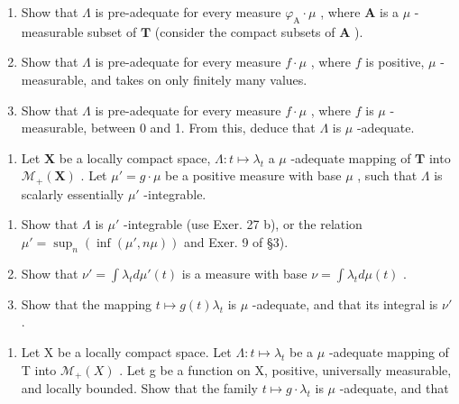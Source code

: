 \begin{enumerate}
\def\labelenumi{\alph{enumi})}
\item
  Show that \(\Lambda\) is pre-adequate for every measure \(\varphi_{\mathrm{A}}\cdot \mu\) , where \(\mathbf{A}\) is a \(\mu\) -measurable subset of \(\mathbf{T}\) (consider the compact subsets of \(\mathbf{A}\) ).
\item
  Show that \(\Lambda\) is pre-adequate for every measure \(f \cdot \mu\) , where \(f\) is positive, \(\mu\) -measurable, and takes on only finitely many values.
\item
  Show that \(\Lambda\) is pre-adequate for every measure \(f \cdot \mu\) , where \(f\) is \(\mu\) -measurable, between 0 and 1. From this, deduce that \(\Lambda\) is \(\mu\) -adequate.
\end{enumerate}

\begin{enumerate}
\def\labelenumi{\arabic{enumi})}
\setcounter{enumi}{27}
\tightlist
\item
  Let \(\mathbf{X}\) be a locally compact space, \(\Lambda : t \mapsto \lambda_t\) a \(\mu\) -adequate mapping of \(\mathbf{T}\) into \(\mathcal{M}_+(\mathbf{X})\) . Let \(\mu' = g \cdot \mu\) be a positive measure with base \(\mu\) , such that \(\Lambda\) is scalarly essentially \(\mu'\) -integrable.
\end{enumerate}

\begin{enumerate}
\def\labelenumi{\alph{enumi})}
\item
  Show that \(\Lambda\) is \(\mu'\) -integrable (use Exer. 27 b), or the relation \(\mu' = \sup_n \left( \inf(\mu', n\mu) \right)\) and Exer. 9 of §3).
\item
  Show that \(\nu' = \int \lambda_t d\mu'(t)\) is a measure with base \(\nu = \int \lambda_t d\mu(t)\) .
\item
  Show that the mapping \(t \mapsto g(t)\lambda_t\) is \(\mu\) -adequate, and that its integral is \(\nu'\) .
\end{enumerate}

\begin{enumerate}
\def\labelenumi{\arabic{enumi})}
\setcounter{enumi}{28}
\tightlist
\item
  Let X be a locally compact space. Let \(\Lambda: t \mapsto \lambda_{t}\) be a \(\mu\) -adequate mapping of T into \(\mathcal{M}_{+}(X)\) . Let g be a function on X, positive, universally measurable, and locally bounded. Show that the family \(t \mapsto g \cdot \lambda_{t}\) is \(\mu\) -adequate, and that
\end{enumerate}

